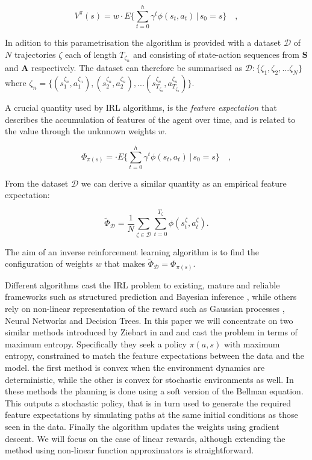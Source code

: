 \documentclass[letterpaper]{article}
\begin{document}
\begin{equation}
 	V^\pi(s) = w \cdot E\{\sum_{t = 0}^h \gamma^t\phi(s_t,a_t)\,\vert\, s_0 = s\}\quad,
\end{equation}

In adition to this parametrisation the algorithm is provided with a dataset ${\mathcal{D}}$ of $N$ trajectories $\zeta$ each of length $T_{\zeta_n}$ and consisting of state-action sequences from $\mathbf{S}$ and $\mathbf{A}$ respectively. The dataset can therefore be summarised as $\mathcal{D}:\big\{ \zeta_1,\zeta_2,...\zeta_N \big\}$ where $\zeta_n = \{(s^{\zeta_n}_1,a^{\zeta_n}_1),(s^{\zeta_n}_2,a^{\zeta_n}_2),...(s^{\zeta_n}_{T_{\zeta_n}},a^{\zeta_n}_{T_{\zeta_n}})\}$. 

A crucial quantity used by IRL algorithms, is the \emph{feature expectation} that describes the accumulation of features of the agent over time, and is related to the value through the unknnown weights $w$. 

\begin{equation}
 	\Phi_{\pi(s)} = \cdot E\{\sum_{t = 0}^h \gamma^t\phi(s_t,a_t)\,\vert\, s_0 = s\}\quad, \label{eqn:model_fe}
\end{equation}

From the dataset ${\mathcal{D}}$ we can derive a similar quantity as an empirical feature expectation:

\begin{equation}
	\widetilde{\Phi}_{\mathcal{D}} =\frac{1}{N}\sum_{\zeta\in\mathcal{D}}\sum_{t=0}^{T_{\zeta}}\phi(s^\zeta_t,a^\zeta_t). \label{eqn:empirical_fe}
\end{equation}

The aim of an inverse reinforcement learning algorithm is to find the configuration of weights $w$ that makes $\widetilde{\Phi}_{\mathcal{D}} = \Phi_{\pi(s)}$. 

Different algorithms cast the IRL problem to existing, mature and reliable frameworks such as structured prediction \cite{ratliff2006maximum} and Bayesian inference \cite{ramachandran2007bayesian}, while others rely on non-linear representation of the reward such as Gaussian processes \cite{levine2011nonlinear}, Neural Networks and Decision Trees\cite{ratliff2007boosting}. In this paper we will concentrate on two similar methods introduced by Ziebart in \cite{ziebart2008maximum} and \cite{ziebart2010modelingthesis} and cast the problem in terms of maximum entropy. Specifically they seek a policy $\pi(a,s)$ with maximum entropy, constrained to match the feature expectations between the data and the model. the first method is convex when the environment dynamics are deterministic, while the other is convex for stochastic environments as well. In these methods the planning is done using a soft version of the Bellman equation\cite{sutton1998reinforcement}. This outputs a stochastic policy, that is in turn used to generate the required feature expectations by simulating paths at the same initial conditions as those seen in the data. Finally the algorithm updates the weights using gradient descent. We will focus on the case of linear rewards, although extending the method using non-linear function approximators is straightforward.
\end{document}
